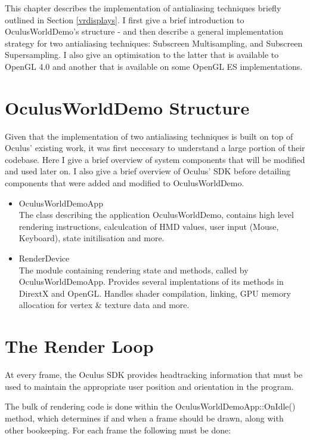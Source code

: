 \documentclass[12pt,a4paper,twoside,openright]{report}
\begin{document}
This chapter describes the implementation of antialiasing techniques briefly outlined in Section \ref{vrdisplays}. I first give a brief introduction to OculusWorldDemo's structure - and then describe a general implementation strategy for two antialiasing techniques: Subscreen Multisampling, and Subscreen Supersampling. I also give an optimisation to the latter that is available to OpenGL 4.0 and another that is available on some OpenGL ES implementations. 

\section{OculusWorldDemo Structure}

Given that the implementation of two antialiasing techniques is built on top of Oculus' existing work, it was first neccesary to understand a large portion of their codebase.
Here I give a brief overview of system components that will be modified and used later on. I also give a brief overview of Oculus' SDK before detailing components that were added and modified to OculusWorldDemo.

\begin{itemize}
\item OculusWorldDemoApp \\
  The class describing the application OculusWorldDemo, contains high level rendering instructions, calculcation of HMD values, user input (Mouse, Keyboard), state initilisation and more.

\item RenderDevice \\
  The module containing rendering state and methods, called by OculusWorldDemoApp. Provides several implentations of its methods in DirextX and OpenGL. Handles shader compilation, linking, GPU memory allocation for vertex \& texture data and more.

\end{itemize}
\section{The Render Loop}
At every frame, the Oculus SDK provides headtracking information that must be used to maintain the appropriate user position and orientation in the program.

The bulk of rendering code is done within the OculusWorldDemoApp::OnIdle() method, which determines if and when a frame should be drawn, along with other bookeeping.
For each frame the following must be done:
\end{document}
